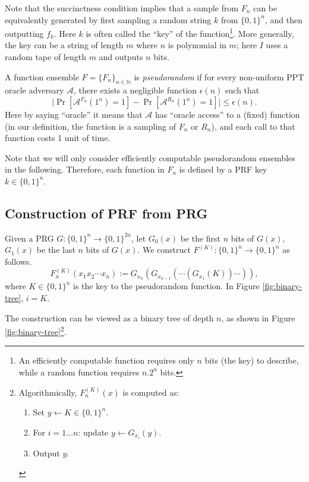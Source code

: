 \documentclass[12pt]{tufte-book}
\newcommand{\ma}{\mathcal{A}}
\begin{document}
Note that the succinctness condition implies that a sample from $F_n$ can be equivalently generated by first sampling a random string $k$ from $\{0, 1\}^n$, and then outputting $f_k$. Here $k$ is often called the ``key'' of the function\footnote{An efficiently computable function requires only $n$ bits (the key) to describe, while a random function requires $n.2^n$ bits.}. More generally, the key can be a string of length $m$ where $n$ is polynomial in $m$; here $I$ uses a random tape of length $m$ and outputs $n$ bits. %

\begin{definition}
    A function ensemble $F = \{F_n\}_{n \in \mathbb{N}}$ is \emph{pseudorandom} if
    for every non-uniform PPT oracle adversary $\ma$, there exists a negligible function $\epsilon(n)$ such that
    \[
        \big| \Pr[\ma^{F_n} (1^n) = 1] - \Pr[\ma^{R_n} (1^n) = 1]  \big| \leq \epsilon(n).
    \]
    Here by saying ``oracle'' it means that $\ma$ has ``oracle access'' to a (fixed) function (in our definition, the function is a sampling of $F_n$ or $R_n$), and each call to that function costs 1 unit of time.
\end{definition}

Note that we will only consider efficiently computable pseudorandom ensembles in the following. Therefore, each function in $F_n$ is defined by a PRF key $k \in \{0, 1\}^n$.


\subsection{Construction of PRF from PRG}

\begin{construction}
    Given a PRG $G: \{0, 1\}^n \rightarrow \{0, 1\}^{2n}$,
    let $G_0(x)$ be the first $n$ bits of $G(x)$, $G_1(x)$ be the last $n$ bits of $G(x)$.
    We construct $F^{(K)}: \{0, 1\}^n \rightarrow \{0, 1\}^n$ as follows.
    \[
        F^{(K)}_n(x_1 x_2 \cdots x_n) := G_{x_n}(G_{x_{n-1}} (\cdots(G_{x_1}(K)) \cdots  )),
    \]
    where $K \in \{0,1\}^n$ is the key to the pseudorandom function. In Figure \ref{fig:binary-tree}, $i = K$.
\end{construction}
The construction can be viewed as a binary tree of depth $n$, as shown in Figure \ref{fig:binary-tree}\footnote{Algorithmically, $F_n^{(K)}(x)$ is computed as:
\begin{enumerate}
    \item Set $y \gets K \in \{0, 1\}^n$.
    \item For $i = 1 \dots n$: update $y \gets G_{x_i}(y)$.
    \item Output $y$.
\end{enumerate}
}.
\end{document}
